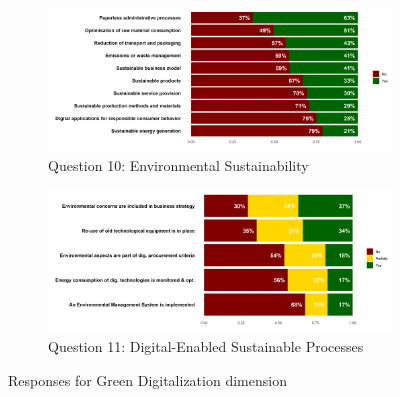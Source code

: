 \documentclass[12pt]{report}
\begin{document}
\begin{figure}
    \centering
    \begin{subfigure}[b]{0.8\textwidth}
        \centering
        \includegraphics[width=\linewidth]{../Output/q10.png}
        \caption{Question 10: Environmental Sustainability}
    \end{subfigure}
    \vfill
    \begin{subfigure}[b]{0.8\textwidth}
        \centering
        \includegraphics[width=\linewidth]{../Output/q11.png}
        \caption{Question 11: Digital-Enabled Sustainable Processes}
    \end{subfigure}
    \caption{Responses for Green Digitalization dimension}
\end{figure}

\nocite{*}
\printbibliography
\end{document}
